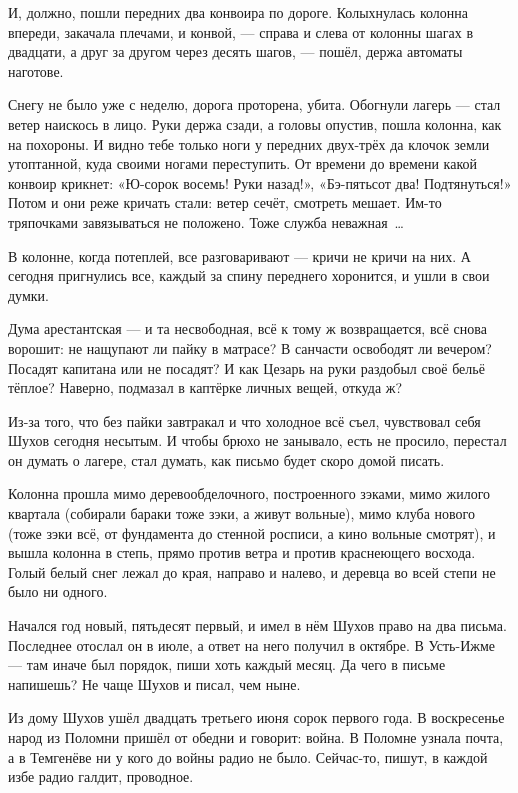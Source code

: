 И, должно, пошли передних два конвоира по дороге. Колыхнулась колонна впереди, закачала 
плечами, и конвой, --- справа и слева от колонны шагах в двадцати, а друг за другом через десять 
шагов, --- пошёл, держа автоматы наготове.

Снегу не было уже с неделю, дорога проторена, убита. Обогнули лагерь --- стал ветер наискось в 
лицо. Руки держа сзади, а головы опустив, пошла колонна, как на похороны. И видно тебе только 
ноги у передних двух-трёх да клочок земли утоптанной, куда своими ногами переступить. От 
времени до времени какой конвоир крикнет: «Ю-сорок восемь! Руки назад!», «Бэ-пятьсот два! 
Подтянуться!» Потом и они реже кричать стали: ветер сечёт, смотреть мешает. Им-то тряпочками 
завязываться не положено. Тоже служба неважная~\dots{}

В колонне, когда потеплей, все разговаривают --- кричи не кричи на них. А сегодня пригнулись 
все, каждый за спину переднего хоронится, и ушли в свои думки.

Дума арестантская --- и та несвободная, всё к тому ж возвращается, всё снова ворошит: не 
нащупают ли пайку в матрасе? В санчасти освободят ли вечером? Посадят капитана или не 
посадят? И как Цезарь на руки раздобыл своё бельё тёплое? Наверно, подмазал в каптёрке личных 
вещей, откуда ж?

Из-за того, что без пайки завтракал и что холодное всё съел, чувствовал себя Шухов сегодня 
несытым. И чтобы брюхо не занывало, есть не просило, перестал он думать о лагере, стал думать, 
как письмо будет скоро домой писать.

Колонна прошла мимо деревообделочного, построенного зэками, мимо жилого квартала (собирали 
бараки тоже зэки, а живут вольные), мимо клуба нового (тоже зэки всё, от фундамента до стенной 
росписи, а кино вольные смотрят), и вышла колонна в степь, прямо против ветра и против 
краснеющего восхода. Голый белый снег лежал до края, направо и налево, и деревца во всей 
степи не было ни одного.

Начался год новый, пятьдесят первый, и имел в нём Шухов право на два письма. Последнее 
отослал он в июле, а ответ на него получил в октябре. В Усть-Ижме --- там иначе был порядок, пиши 
хоть каждый месяц. Да чего в письме напишешь? Не чаще Шухов и писал, чем ныне.

Из дому Шухов ушёл двадцать третьего июня сорок первого года. В воскресенье народ из Поломни 
пришёл от обедни и говорит: война. В Поломне узнала почта, а в Темгенёве ни у кого до войны 
радио не было. Сейчас-то, пишут, в каждой избе радио галдит, проводное.


